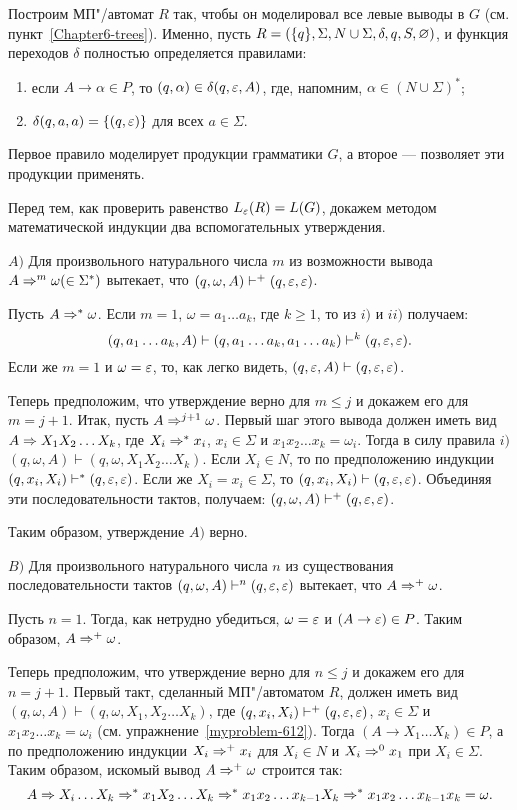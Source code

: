 \begin{myproof}
Построим МП"/автомат $R$ так, чтобы он моделировал все левые выводы в $G$ (см. пункт~\ref{Chapter6-trees}). Именно, пусть $R=(\{q\},\Sigma,N\cup\Sigma,\delta,q,S,\varnothing)$, и функция переходов $\delta$ полностью определяется правилами:
\begin{enumerate}[label=(\emph{\roman*})]
    \item если $A\to\alpha\in P$, то $(q,\alpha)\in\delta(q,\varepsilon,A)$, где, напомним, $\alpha\in(N\cup\Sigma)^*$;
    \item $\delta(q,a,a)=\{(q,\varepsilon)\}$ для всех $a\in\Sigma$.
\end{enumerate}
Первое правило моделирует продукции грамматики $G$, а второе --- позволяет эти продукции применять.

Перед тем, как проверить равенство $L_\varepsilon(R)=L(G)$, докажем методом математической индукции два вспомогательных утверждения.

$A)$ Для произвольного натурального числа $m$ из возможности вывода $A\Rightarrow^m\omega(\in\Sigma^*)$ вытекает, что $(q,\omega,A)\vdash^+(q,\varepsilon,\varepsilon)$.

Пусть $A\Rightarrow^*\omega$. Если $m=1$, $\omega=a_1 \ldots a_k$, где $k\ge 1$, то из $i)$ и $ii)$ получаем:
\[
(q,a_1 \ldots a_k,A) \vdash (q,a_1 \ldots a_k,a_1 \ldots a_k)\vdash^k (q,\varepsilon,\varepsilon).
\]
Если же $m=1$ и $\omega=\varepsilon$, то, как легко видеть, $(q,\varepsilon,A)\vdash (q,\varepsilon,\varepsilon)$.

Теперь предположим, что утверждение верно для $m\le j$ и докажем его для $m=j+1$. Итак, пусть $A\Rightarrow^{j+1}\omega$. Первый шаг этого вывода должен иметь вид $A\Rightarrow X_1X_2 \ldots X_k$, где $X_i\Rightarrow^*x_i$, $x_i\in\Sigma$ и $x_1x_2\ldots x_k=\omega_i$. Тогда в силу правила $i)$ $(q,\omega,A) \vdash (q,\omega,X_1X_2\ldots X_k)$. Если $X_i\in N$, то по предположению индукции $(q,x_i,X_i)\vdash^*(q,\varepsilon,\varepsilon)$. Если же $X_i=x_i\in\Sigma$, то $(q,x_i,X_i) \vdash  (q,\varepsilon,\varepsilon)$. Объединяя эти последовательности тактов, получаем: $(q,\omega,A) \vdash^+ (q,\varepsilon,\varepsilon)$.

Таким образом, утверждение $A)$ верно.

$B)$ Для произвольного натурального числа $n$ из существования последовательности тактов $(q,\omega,A)\vdash^n(q,\varepsilon,\varepsilon)$ вытекает, что $A\Rightarrow^+\omega$.

Пусть $n=1$. Тогда, как нетрудно убедиться, $\omega=\varepsilon$ и $(A\to \varepsilon)\in P$. Таким образом, $A\Rightarrow^+\omega$.

Теперь предположим, что утверждение верно для $n\le j$ и докажем его для $n=j+1$. Первый такт, сделанный МП"/автоматом $R$, должен иметь вид $(q,\omega,A)\vdash(q,\omega,X_1,X_2\ldots X_k)$, где $(q,x_i,X_i)\vdash^+(q,\varepsilon,\varepsilon)$, $x_i\in\Sigma$ и $x_1x_2\ldots x_k=\omega_i$ (см. упражнение~\ref{myproblem-612}). Тогда $(A\to X_1\ldots X_k)\in P$, а по предположению индукции $X_i\Rightarrow^+x_i$ для $X_i\in N$ и $X_i\Rightarrow^0x_1$ при $X_i\in\Sigma$. Таким образом, искомый вывод $A\Rightarrow^+\omega$ строится так:
\[
    A   \Rightarrow X_i \ldots X_k \Rightarrow^* x_1X_2\ldots X_k
        \Rightarrow^* x_1x_2\ldots x_{k-1}X_k
        \Rightarrow^* x_1x_2\ldots x_{k-1}x_k=\omega.
\]


\end{myproof}
